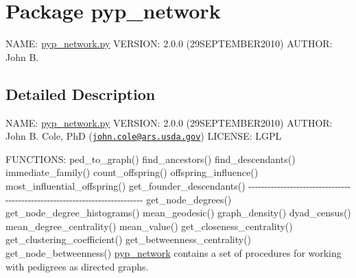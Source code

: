 \hypertarget{namespacepyp__network}{
\section{Package pyp\_\-network}
\label{namespacepyp__network}
}


NAME: \hyperlink{pyp__network_8py_source}{pyp\_\-network.py} VERSION: 2.0.0 (29SEPTEMBER2010) AUTHOR: John B.  




\subsection{Detailed Description}
NAME: \hyperlink{pyp__network_8py_source}{pyp\_\-network.py} VERSION: 2.0.0 (29SEPTEMBER2010) AUTHOR: John B. Cole, PhD (\href{mailto:john.cole@ars.usda.gov}{\tt john.cole@ars.usda.gov}) LICENSE: LGPL

FUNCTIONS: ped\_\-to\_\-graph() find\_\-ancestors() find\_\-descendants() immediate\_\-family() count\_\-offspring() offspring\_\-influence() most\_\-influential\_\-offspring() get\_\-founder\_\-descendants() -\/-\/-\/-\/-\/-\/-\/-\/-\/-\/-\/-\/-\/-\/-\/-\/-\/-\/-\/-\/-\/-\/-\/-\/-\/-\/-\/-\/-\/-\/-\/-\/-\/-\/-\/-\/-\/-\/-\/-\/-\/-\/-\/-\/-\/-\/-\/-\/-\/-\/-\/-\/-\/-\/-\/-\/-\/-\/-\/-\/-\/-\/-\/-\/-\/-\/-\/-\/-\/-\/-\/-\/-\/-\/-\/ get\_\-node\_\-degrees() get\_\-node\_\-degree\_\-histograms() mean\_\-geodesic() graph\_\-density() dyad\_\-census() mean\_\-degree\_\-centrality() mean\_\-value() get\_\-closeness\_\-centrality() get\_\-clustering\_\-coefficient() get\_\-betweenness\_\-centrality() get\_\-node\_\-betweenness() \hyperlink{namespacepyp__network}{pyp\_\-network} contains a set of procedures for working with pedigrees as directed graphs. 